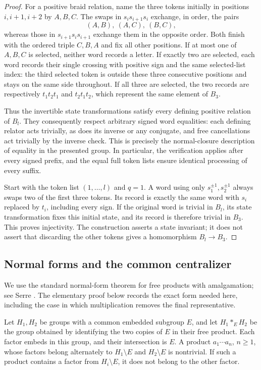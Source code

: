 \begin{proof}
For a positive braid relation, name the three tokens initially in
positions $i,i+1,i+2$ by $A,B,C$.  The swaps in $s_is_{i+1}s_i$
exchange, in order, the pairs
\[
 (A,B),\ (A,C),\ (B,C),
\]
whereas those in $s_{i+1}s_is_{i+1}$ exchange them in the opposite
order.  Both finish with the ordered triple $C,B,A$ and fix all
other positions.  If at most one of $A,B,C$ is selected, neither
word records a letter.  If exactly two are selected, each word
records their single crossing with positive sign and the same
selected-list index: the third selected token is outside these
three consecutive positions and stays on the same side throughout.
If all three are selected, the two records are respectively
$t_1t_2t_1$ and $t_2t_1t_2$, which represent the same element of $B_3$.

Thus the invertible state transformations satisfy every defining
positive relation of $B_l$.  They consequently respect arbitrary
signed word equalities: each defining relator acts trivially, as
does its inverse or any conjugate, and free cancellations act
trivially by the inverse check.  This is precisely the normal-closure
description of equality in the presented group.  In particular,
the verification applies after every signed prefix, and the equal
full token lists ensure identical processing of every suffix.

Start with the token list $(1,\ldots,l)$ and $q=1$.  A word using
only $s_1^{\pm1},s_2^{\pm1}$ always swaps two of the first three
tokens.  Its record is exactly the same word with $s_i$ replaced
by $t_i$, including every sign.  If the original word is trivial
in $B_l$, its state transformation fixes this initial state, and
its record is therefore trivial in $B_3$.  This proves injectivity.
The construction asserts a state invariant; it does not assert that
discarding the other tokens gives a homomorphism $B_l\to B_3$.
\end{proof}

\subsection{Normal forms and the common centralizer}

We use the standard normal-form theorem for free products with
amalgamation; see Serre \cite[Chapter~I, \S1.2, Theorems~1--2]{Serre1980}.
The elementary proof below records the exact form needed here, including
the case in which multiplication removes the final representative.

\begin{lemma}\label{lem:amalgam-normal-form}
Let $H_1,H_2$ be groups with a common embedded subgroup $E$, and
let $H_1*_E H_2$ be the group obtained by identifying the two copies
of $E$ in their free product.  Each factor embeds in this group,
and their intersection is $E$.  A product $a_1\cdots a_n$, $n\ge1$,
whose factors belong alternately to $H_1\setminus E$ and
$H_2\setminus E$ is nontrivial.  If such a product contains a
factor from $H_i\setminus E$, it does not belong to the other factor.
\end{lemma}

